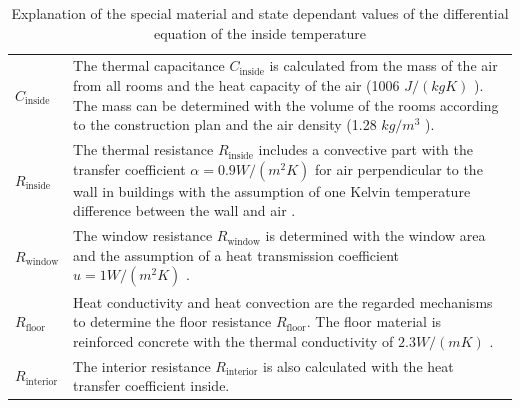     \begin{table}[H]
        \centering
        \begin{tabular}{l p{13cm}}
            $C_\text{inside}$ & The thermal capacitance $C_\text{inside}$ is calculated from the mass of the air from all rooms and the heat capacity of the air (1006 $J/(kg K)$ \cite{Weigand.2016}). The mass can be determined with the volume of the rooms according to the construction plan \cite{Bauplan} and the air density (1.28 $kg/m^3$ \cite{Weigand.2016}).\\
            $R_\text{inside}$ & The thermal resistance $R_\text{inside}$ includes a convective part with the transfer coefficient $\alpha = 0.9 W/(m^2 K)$ for air perpendicular to the wall in buildings with the assumption of one Kelvin temperature difference between the wall and air \cite{Schweizer-fnalpha}.\\
            $R_\text{window}$ & The window resistance $R_\text{window}$ is determined with the window area and the assumption of a heat transmission coefficient $u = 1 W/(m^2 K)$ \cite{ThorbenFrahm.2021}.\\
            $R_\text{floor}$ & Heat conductivity and heat convection are the regarded mechanisms to determine the floor resistance $R_\text{floor}$. The floor material is reinforced concrete with the thermal conductivity of $2.3 W/(m K)$ \cite{AntonSchweizer.12.10.2021}.\\
            $R_\text{interior}$ & The interior resistance $R_\text{interior}$ is also calculated with the heat transfer coefficient inside.
        \end{tabular}
        \caption{Explanation of the special material and state dependant values of the differential equation of the inside temperature}
        \label{tab:valuesOfInsideTemperature}
    \end{table}
    
